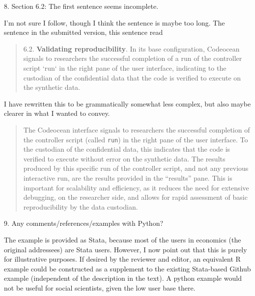 \begin{referee}
8.
Section 6.2: The first sentence seems incomplete.

\end{referee}

\begin{response}
I'm not sure I follow, though I think the sentence is maybe too long. The sentence in the submitted version, this sentence read 
    \begin{quote}
6.2. \textbf{Validating reproducibility}. In its base configuration, Codeocean signals to researchers the
successful completion of a run of the controller script ‘run‘ in the right pane of the user interface,
indicating to the custodian of the confidential data that the code is verified to execute on the
synthetic data.
\end{quote}

I have rewritten this to be grammatically somewhat less complex, but also maybe clearer in what I wanted to convey.

\begin{quote}
    The Codeocean interface signals to researchers the successful completion  of the controller script (called \texttt{run}) in the right pane of the user interface. To the custodian of the confidential data, this indicates that the code is verified to execute without error on the synthetic data. The results produced by this specific run of the controller script, and not any previous interactive run, are the results provided in the ``results'' pane. This is important for scalability and efficiency, as it reduces the need for extensive debugging, on the researcher side, and allows for rapid assessment of basic reproducibility by the data custodian.
\end{quote}

\end{response}


\begin{referee}

9.
Any comments/references/examples with Python?

\end{referee}

\begin{response}
    The example is provided as Stata, because most of the users in economics (the original addressees) are Stata users. However, I now point out that this is purely for illustrative purposes. If desired by the reviewer and editor, an equivalent R example could be constructed as a supplement to the existing Stata-based Github example (independent of the description in the text). A python example would not be useful for social scientists, given the low user base there.
\end{response}